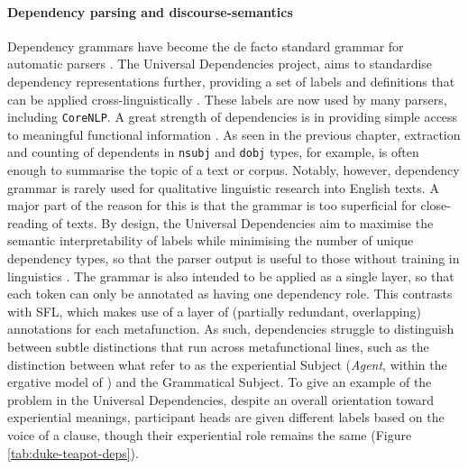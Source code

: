 \paragraph{Dependency parsing and discourse-semantics}

Dependency grammars have become the de facto standard grammar for automatic parsers \cite{marneffe_ud_2014}. The Universal Dependencies project, aims to standardise dependency representations further, providing a set of labels and definitions that can be applied cross-linguistically \cite{nivre_towards_2015}. These labels are now used by many parsers, including \texttt{CoreNLP}. A great strength of dependencies is in providing simple access to meaningful functional information \cite{de2008stanford}. As seen in the previous chapter, extraction and counting of dependents in \texttt{nsubj} and \texttt{dobj} types, for example, is often enough to summarise the topic of a text or corpus. Notably, however, dependency grammar is rarely used for qualitative linguistic research into English texts. A major part of the reason for this is that the grammar is too superficial for close\hyp{}reading of texts. By design, the Universal Dependencies aim to maximise the semantic interpretability of labels while minimising the number of unique dependency types, so that the parser output is useful to those without training in linguistics \cite{marneffe_ud_2014}. The grammar is also intended to be applied as a single layer, so that each token can only be annotated as having one dependency role. This contrasts with \gls{SFL}, which makes use of a layer of (partially redundant, overlapping) annotations for each metafunction. As such, dependencies struggle to distinguish between subtle distinctions that run across metafunctional lines, such as the distinction between what \textcite{halliday_introduction_2004} refer to as the experiential Subject (\emph{Agent}, within the ergative model of ) and the Grammatical Subject. To give an example of the problem \cite[using a classic example from the IFG---][pp.~53--58]{halliday_introduction_2004} in the Universal Dependencies, despite an overall orientation toward experiential meanings, participant heads are given different labels based on the voice of a clause, though their experiential role remains the same (Figure \ref{tab:duke-teapot-deps}).

